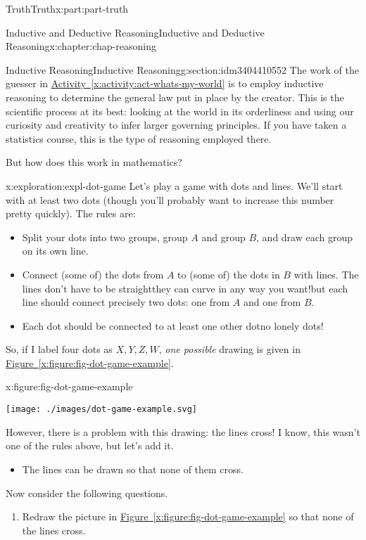 \documentclass[oneside,10pt,]{book}
\newcommand{\xreffont}{\relax}
\numberwithin{equation}{section}
\begin{document}
\begin{partptx}{Truth}{}{Truth}{}{}{x:part:part-truth}
\begin{chapterptx}{Inductive and Deductive Reasoning}{}{Inductive and Deductive Reasoning}{}{}{x:chapter:chap-reasoning}
\begin{sectionptx}{Inductive Reasoning}{}{Inductive Reasoning}{}{}{g:section:idm3404410552}
The work of the guesser in \hyperref[x:activity:act-whats-my-world]{Activity~{\xreffont\ref{x:activity:act-whats-my-world}}} is to employ inductive reasoning to determine the general law put in place by the creator. This is the scientific process at its best: looking at the world in its orderliness and using our curiosity and creativity to infer larger governing principles. If you have taken a statistics course, this is the type of reasoning employed there.%
\par
But how does this work in mathematics?%
\begin{exploration}{}{x:exploration:expl-dot-game}%
Let's play a game with dots and lines. We'll start with at least two dots (though you'll probably want to increase this number pretty quickly). The rules are:%
%
\begin{itemize}[label=\textbullet]
\item{}Split your dots into two groups, group \(A\) and group \(B\), and draw each group on its own line.%
\item{}Connect (some of) the dots from \(A\) to (some of) the dots in \(B\) with lines. The lines don't have to be straight\textemdash{}they can curve in any way you want!\textemdash{}but each line should connect precisely two dots: one from \(A\) and one from \(B\).%
\item{}Each dot should be connected to at least one other dot\textemdash{}no lonely dots!%
\end{itemize}
So, if I label four dots as \(X, Y, Z, W\), \emph{one possible} drawing is given in \hyperref[x:figure:fig-dot-game-example]{Figure~{\xreffont\ref{x:figure:fig-dot-game-example}}}.%
\begin{figureptx}{}{x:figure:fig-dot-game-example}{}%
\begin{image}{0.325}{0.35}{0.325}%
\texttt{[image: ./images/dot-game-example.svg]}
\end{image}%
\tcblower
\end{figureptx}%
However, there is a problem with this drawing: the lines cross! I know, this wasn't one of the rules above, but let's add it.%
%
\begin{itemize}[label=\textbullet]
\item{}The lines can be drawn so that none of them cross.%
\end{itemize}
Now consider the following questions.%
%
\begin{enumerate}
\item{}Redraw the picture in \hyperref[x:figure:fig-dot-game-example]{Figure~{\xreffont\ref{x:figure:fig-dot-game-example}}} so that none of the lines cross.%

\end{enumerate}
\end{exploration}
\end{sectionptx}
\end{chapterptx}
\end{partptx}
\end{document}
